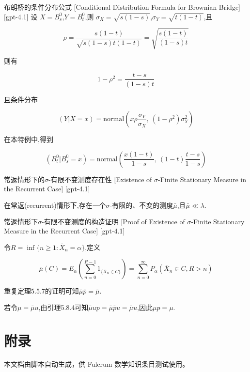 \documentclass[UTF8]{ctexart}
\begin{document}
    \begin{ppt}
        {布朗桥的条件分布公式}
        [Conditional Distribution Formula for Brownian Bridge]
        [gpt-4.1]
        设 $X = B_s^0$,$Y = B_t^0$,则 $\sigma_X = \sqrt{s(1-s)}$,$\sigma_Y = \sqrt{t(1-t)}$,且

\[
\rho = \frac{s(1-t)}{\sqrt{s(1-s)t(1-t)}} = \sqrt{\frac{s(1-t)}{(1-s)t}}
\]

则有

\[
1 - \rho^2 = \frac{t-s}{(1-s)t}
\]

且条件分布

\[
(Y|X=x) = \mathrm{normal}\left( x\rho\frac{\sigma_Y}{\sigma_X},\ (1-\rho^2)\sigma_Y^2 \right)
\]

在本特例中,得到

\[
(B_t^0 | B_s^0 = x) = \mathrm{normal} \left( \frac{x(1-t)}{1-s},\ (1-t)\frac{t-s}{1-s} \right)
\]

    \end{ppt}
    
    
    
    \begin{thm}
        {常返情形下的$\sigma$-有限不变测度存在性}
        [Existence of $\sigma$-Finite Stationary Measure in the Recurrent Case]
        [gpt-4.1]
        
在常返(recurrent)情形下,存在一个$\sigma$-有限的、不变的测度$\bar{\mu}$,且$\bar{\mu} \ll \lambda$.

    \end{thm}
    
    
    
    \begin{prf}
        {常返情形下$\sigma$-有限不变测度的构造证明}
        [Proof of Existence of $\sigma$-Finite Stationary Measure in the Recurrent Case]
        [gpt-4.1]
        
令$R = \inf\{ n \geq 1 : \bar{X}_n = \alpha \}$,定义

\[
\bar{\mu}(C) = E_\alpha\left( \sum_{n=0}^{R-1} 1_{\{ \bar{X}_n \in C \}} \right) = \sum_{n=0}^\infty P_\alpha(\bar{X}_n \in C, R > n)
\]

重复定理5.5.7的证明可知$\bar{\mu} \bar{p} = \bar{\mu}$.

若令$\mu = \bar{\mu} 
u$,由引理5.8.4可知$\bar{\mu} 
u p = \bar{\mu} \bar{p} 
u = \bar{\mu} 
u$,因此$\mu p = \mu$.

    \end{prf}
    
    

    \section{附录}
    本文档由脚本自动生成，供 Fulcrum 数学知识条目测试使用。
\end{document}

